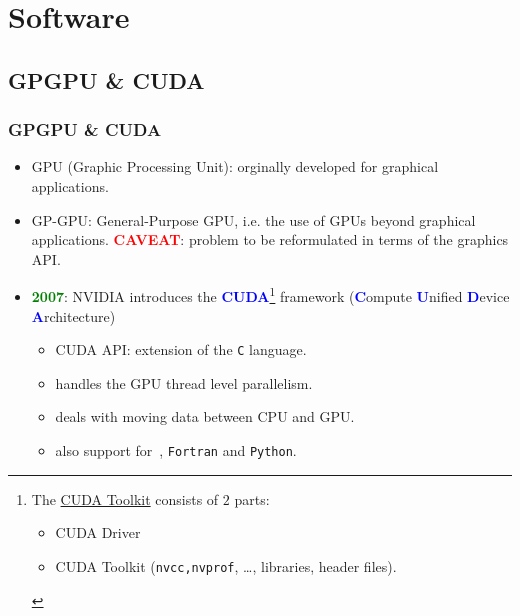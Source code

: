 \section{Software}
\subsection{GPGPU \& CUDA}
\begin{frame}
  \frametitle{GPGPU \& CUDA}
     \begin{itemize}
        \item GPU (Graphic Processing Unit):\newline 
	      orginally developed for graphical applications.
        \item GP-GPU: General-Purpose GPU, i.e.\newline 
	      the use of GPUs beyond graphical applications.\newline
	      \textbf{\textcolor{red}{CAVEAT}}: problem to be reformulated in terms of the graphics API.
      \item \textbf{\textcolor{green}{2007}}: NVIDIA introduces the \textbf{\textcolor{blue}{CUDA}}\footnote{The \href{https://developer.nvidia.com/cuda-downloads}{CUDA Toolkit} consists of $2$ parts: 
      \begin{itemize} 
	      \item CUDA Driver 
	      \item CUDA Toolkit (\texttt{nvcc,nvprof}, \ldots, libraries, header files).
      \end{itemize} } framework\newline 
		(\textbf{\textcolor{blue}{C}}ompute \textbf{\textcolor{blue}{U}}nified 
		     \textbf{\textcolor{blue}{D}}evice \textbf{\textcolor{blue}{A}}rchitecture) 
              \begin{itemize}
	         \item CUDA API: extension of the \texttt{C} language.
                 \item handles the GPU thread level parallelism.
                 \item deals with moving data between CPU and GPU.
		 \item also support for \CC\,, \texttt{Fortran} and \texttt{Python}.			 
              \end{itemize}			 
     \end{itemize}		     
\end{frame} 

